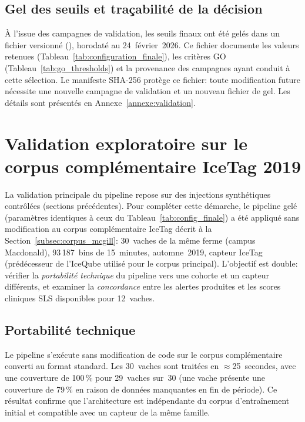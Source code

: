 \FloatBarrier
\subsection{Gel des seuils et traçabilité de la décision}

À l'issue des campagnes de validation, les seuils finaux ont été gelés dans un fichier
versionné (), horodaté au 24~février~2026. Ce fichier
documente les valeurs retenues (Tableau~\ref{tab:configuration_finale}), les critères GO
(Tableau~\ref{tab:go_thresholds}) et la provenance des campagnes ayant conduit à cette
sélection. Le manifeste SHA-256 protège ce fichier: toute modification future nécessite
une nouvelle campagne de validation et un nouveau fichier de gel. Les détails sont
présentés en Annexe~\ref{annexe:validation}.

\FloatBarrier

\section{Validation exploratoire sur le corpus complémentaire IceTag 2019}
\label{sec:validation_mcgill}

La validation principale du pipeline repose sur des injections synthétiques
contrôlées (sections précédentes). Pour compléter cette démarche, le pipeline gelé
(paramètres identiques à ceux du Tableau~\ref{tab:config_finale}) a été appliqué
sans modification au corpus complémentaire IceTag décrit à la
Section~\ref{subsec:corpus_mcgill}: 30~vaches de la même ferme (campus Macdonald),
93\,187~bins de 15~minutes, automne~2019, capteur IceTag (prédécesseur de l'IceQube
utilisé pour le corpus principal). L'objectif est double: vérifier la
\textit{portabilité technique} du pipeline vers une cohorte et un capteur différents,
et examiner la \textit{concordance} entre les alertes produites et les scores
cliniques SLS disponibles pour 12~vaches.

\subsection{Portabilité technique}

Le pipeline s'exécute sans modification de code sur le corpus complémentaire converti
au format standard. Les 30~vaches sont traitées en $\approx$25~secondes, avec une
couverture de 100\,\% pour 29~vaches sur~30 (une vache présente une couverture
de 79\,\% en raison de données manquantes en fin de période). Ce résultat confirme
que l'architecture est indépendante du corpus d'entraînement initial et compatible
avec un capteur de la même famille.

